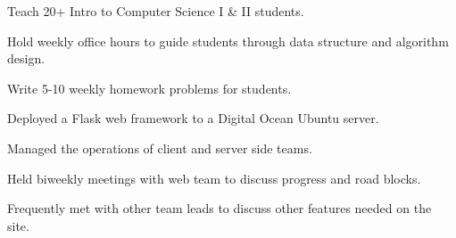 \documentclass[letterpaper]{deedy-resume} %
\begin{document}
\begin{minipage}[t]{0.66\textwidth}

\begin{tightitemize}
\item Teach 20+ Intro to Computer Science I \& II students.
\item Hold weekly office hours to guide students through data structure and algorithm design.
\item Write 5-10 weekly homework problems for students.
\end{tightitemize}

\sectionspace %



\begin{tightitemize}
\item Deployed a Flask web framework to a Digital Ocean Ubuntu server.
\item Managed the operations of client and server side teams.
\item Held biweekly meetings with web team to discuss progress and road blocks.
\item Frequently met with other team leads to discuss other features needed on the site.
\end{tightitemize}





\sectionspace %


\end{minipage}
\end{document}
